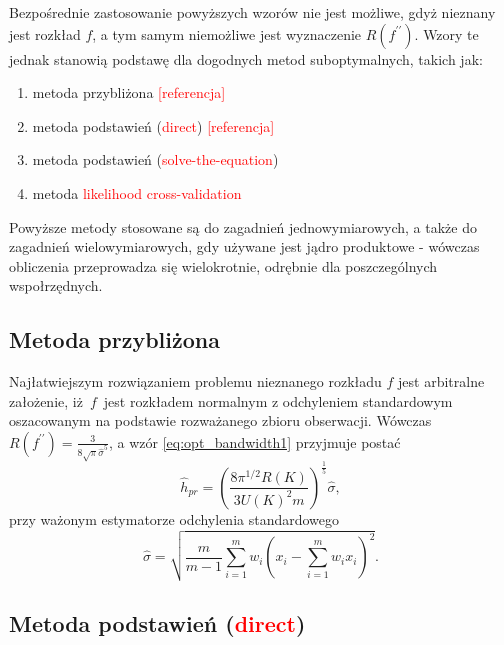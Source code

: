\documentclass[12pt,a4paper,oneside]{book}
\theoremstyle{definition}
\begin{document}
Bezpośrednie zastosowanie powyższych wzorów nie jest możliwe, gdyż nieznany jest rozkład $f$, a tym samym niemożliwe jest wyznaczenie $R(f^{\prime\prime})$. Wzory te jednak stanowią podstawę dla dogodnych metod suboptymalnych, takich jak:
\begin{enumerate}
\item metoda przybliżona \textcolor{red}{[referencja]}
\item metoda podstawień (\textcolor{red}{direct}) \textcolor{red}{[referencja]}
\item metoda podstawień (\textcolor{red}{solve-the-equation})
\item metoda \textcolor{red}{likelihood cross-validation}
\end{enumerate}
Powyższe metody stosowane są do zagadnień jednowymiarowych, a także do zagadnień wielowymiarowych, gdy używane jest jądro produktowe - wówczas obliczenia przeprowadza się wielokrotnie, odrębnie dla poszczególnych wspołrzędnych.

\subsection*{Metoda przybliżona}

Najłatwiejszym rozwiązaniem problemu nieznanego rozkładu $f$ jest arbitralne założenie, iż~$f$~jest rozkładem normalnym z odchyleniem standardowym oszacowanym na podstawie rozważanego zbioru obserwacji. Wówczas $R(f^{\prime\prime}) = \frac{3}{8 \sqrt{\pi} \hat{\sigma}^5}$, a wzór \eqref{eq:opt_bandwidth1} przyjmuje postać
\begin{equation} \label{eq:normal_reference}
\hat{h}_{pr} = \left( \frac{8 \pi^{1/2} R(K)}{3 U(K)^2 m} \right)^\frac{1}{5} \hat{\sigma},
\end{equation}
przy ważonym estymatorze odchylenia standardowego
\begin{equation}
\hat{\sigma} = \sqrt{\frac{m}{m-1} \sum_{i=1}^m w_i (x_i - \sum_{i=1}^m w_i x_i)^2}.
\end{equation}

\subsection*{Metoda podstawień (\textcolor{red}{direct})}
\end{document}
